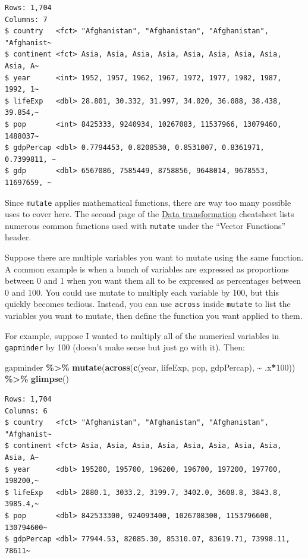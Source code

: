 \documentclass[
]{book}
\makeatletter
\newenvironment{Shaded}{\begin{snugshade}}{\end{snugshade}}
\newcommand{\DecValTok}[1]{\textcolor[rgb]{0.06,0.06,0.06}{#1}}
\newcommand{\FunctionTok}[1]{\textcolor[rgb]{0.27,0.27,0.27}{\textbf{#1}}}
\newcommand{\NormalTok}[1]{#1}
\newcommand{\SpecialCharTok}[1]{\textcolor[rgb]{0.43,0.43,0.43}{\textbf{#1}}}
\newenvironment{kframe}{%
\medskip{}
\setlength{\fboxsep}{.8em}
 \def\at@end@of@kframe{}%
 \ifinner\ifhmode%
  \def\at@end@of@kframe{\end{minipage}}%
  \begin{minipage}{\columnwidth}%
 \fi\fi%
 \def\FrameCommand##1{\hskip\@totalleftmargin \hskip-\fboxsep
 \colorbox{shadecolor}{##1}\hskip-\fboxsep
     \hskip-\linewidth \hskip-\@totalleftmargin \hskip\columnwidth}%
 \MakeFramed {\advance\hsize-\width
   \@totalleftmargin\z@ \linewidth\hsize
   \@setminipage}}%
 {\par\unskip\endMakeFramed%
 \at@end@of@kframe}
\renewenvironment{Shaded}{\begin{kframe}}{\end{kframe}}
\makeatother
\begin{document}
\begin{verbatim}
Rows: 1,704
Columns: 7
$ country   <fct> "Afghanistan", "Afghanistan", "Afghanistan", "Afghanist~
$ continent <fct> Asia, Asia, Asia, Asia, Asia, Asia, Asia, Asia, Asia, A~
$ year      <int> 1952, 1957, 1962, 1967, 1972, 1977, 1982, 1987, 1992, 1~
$ lifeExp   <dbl> 28.801, 30.332, 31.997, 34.020, 36.088, 38.438, 39.854,~
$ pop       <int> 8425333, 9240934, 10267083, 11537966, 13079460, 1488037~
$ gdpPercap <dbl> 0.7794453, 0.8208530, 0.8531007, 0.8361971, 0.7399811, ~
$ gdp       <dbl> 6567086, 7585449, 8758856, 9648014, 9678553, 11697659, ~
\end{verbatim}

Since \texttt{mutate} applies mathematical functions, there are way too many possible uses to cover here. The second page of the \href{https://github.com/rstudio/cheatsheets/raw/master/data-transformation.pdf}{Data transformation} cheatsheet lists numerous common functions used with \texttt{mutate} under the ``Vector Functions'' header.

Suppose there are multiple variables you want to mutate using the same function. A common example is when a bunch of variables are expressed as proportions between 0 and 1 when you want them all to be expressed as percentages between 0 and 100. You could use mutate to multiply each variable by 100, but this quickly becomes tedious. Instead, you can use \texttt{across} inside \texttt{mutate} to list the variables you want to mutate, then define the function you want applied to them.

For example, suppose I wanted to multiply all of the numerical variables in \texttt{gapminder} by 100 (doesn't make sense but just go with it). Then:

\begin{Shaded}
\begin{Highlighting}[]
\NormalTok{gapminder }\SpecialCharTok{\%\textgreater{}\%} 
  \FunctionTok{mutate}\NormalTok{(}\FunctionTok{across}\NormalTok{(}\FunctionTok{c}\NormalTok{(year, lifeExp, pop, gdpPercap), }\SpecialCharTok{\textasciitilde{}}\NormalTok{ .x}\SpecialCharTok{*}\DecValTok{100}\NormalTok{)) }\SpecialCharTok{\%\textgreater{}\%} 
  \FunctionTok{glimpse}\NormalTok{()}
\end{Highlighting}
\end{Shaded}

\begin{verbatim}
Rows: 1,704
Columns: 6
$ country   <fct> "Afghanistan", "Afghanistan", "Afghanistan", "Afghanist~
$ continent <fct> Asia, Asia, Asia, Asia, Asia, Asia, Asia, Asia, Asia, A~
$ year      <dbl> 195200, 195700, 196200, 196700, 197200, 197700, 198200,~
$ lifeExp   <dbl> 2880.1, 3033.2, 3199.7, 3402.0, 3608.8, 3843.8, 3985.4,~
$ pop       <dbl> 842533300, 924093400, 1026708300, 1153796600, 130794600~
$ gdpPercap <dbl> 77944.53, 82085.30, 85310.07, 83619.71, 73998.11, 78611~
\end{verbatim}
\end{document}
